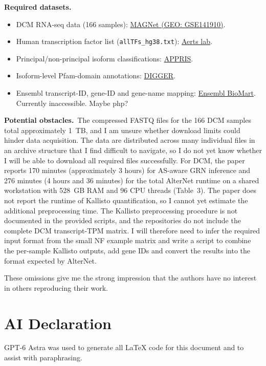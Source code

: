 \documentclass[a4paper,11pt]{article}
\newcommand{\field}[2]{\textbf{#1}\ #2\par}
\begin{document}
\textbf{Required datasets.}
\begin{itemize}
\raggedright
\setlength{\itemsep}{0pt}
\setlength{\parskip}{0pt}
\item DCM RNA-seq data (166 samples): \href{https://www.ncbi.nlm.nih.gov/geo/query/acc.cgi?acc=GSE141910}{MAGNet (GEO: GSE141910)}.
\item Human transcription factor list (\texttt{allTFs\_hg38.txt}): \href{https://resources.aertslab.org/cistarget/tf_lists/}{Aerts lab}.
\item Principal/non-principal isoform classifications: \href{https://apprisws.bioinfo.cnio.es/pub/}{APPRIS}.
\item Isoform-level Pfam-domain annotations: \href{https://exbio.wzw.tum.de/digger/download/}{DIGGER}.
\item Ensembl transcript-ID, gene-ID and gene-name mapping: \href{https://www.ensembl.org/biomart/martview}{Ensembl BioMart}. Currently inaccessible. Maybe php?
\end{itemize}

\field{Potential obstacles.}{The compressed FASTQ files for the 166 DCM samples total approximately 1~TB, and I am unsure whether download limits could hinder data acquisition. The data are distributed across many individual files in an archive structure that I find difficult to navigate, so I do not yet know whether I will be able to download all required files successfully. For DCM, the paper reports 170 minutes (approximately 3 hours) for AS-aware GRN inference and 276 minutes (4 hours and 36 minutes) for the total AlterNet runtime on a shared workstation with 528~GB RAM and 96 CPU threads (Table~3). The paper does not report the runtime of Kallisto quantification, so I cannot yet estimate the additional preprocessing time. The Kallisto preprocessing procedure is not documented in the provided scripts, and the repositories do not include the complete DCM transcript-TPM matrix. I will therefore need to infer the required input format from the small NF example matrix and write a script to combine the per-sample Kallisto outputs, add gene IDs and convert the results into the format expected by AlterNet.}

\vspace{\baselineskip}
These omissions give me the strong impression that the authors have no interest in others reproducing their work.\par

\section*{AI Declaration}
GPT-6 Astra was used to generate all \LaTeX{} code for this document and to assist with paraphrasing.
\end{document}
